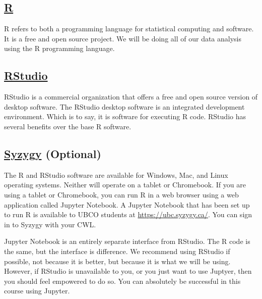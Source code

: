 \documentclass[
]{book}
\begin{document}
\hypertarget{r}{%
\subsection*{\texorpdfstring{\href{https://www.r-project.org/}{R}}{R}}\label{r}}

R refers to both a programming language for statistical computing and software. It is a free and open source project. We will be doing all of our data analysis using the R programming language.

\hypertarget{rstudio}{%
\subsection*{\texorpdfstring{\href{https://rstudio.com/}{RStudio}}{RStudio}}\label{rstudio}}

RStudio is a commercial organization that offers a free and open source version of desktop software. The RStudio desktop software is an integrated development environment. Which is to say, it is software for executing R code. RStudio has several benefits over the base R software.

\hypertarget{syzygy-optional}{%
\subsection*{\texorpdfstring{\href{https://ubc.syzygy.ca/}{Syzygy} (Optional)}{Syzygy (Optional)}}\label{syzygy-optional}}

The R and RStudio software are available for Windows, Mac, and Linux operating systems. Neither will operate on a tablet or Chromebook. If you are using a tablet or Chromebook, you can run R in a web browser using a web application called Jupyter Notebook. A Jupyter Notebook that has been set up to run R is available to UBCO students at \url{https://ubc.syzygy.ca/}. You can sign in to Syzygy with your CWL.

Jupyter Notebook is an entirely separate interface from RStudio. The R code is the same, but the interface is difference. We recommend using RStudio if possible, not because it is better, but because it is what we will be using. However, if RStudio is unavailable to you, or you just want to use Juptyer, then you should feel empowered to do so. You can absolutely be successful in this course using Jupyter.
\end{document}
